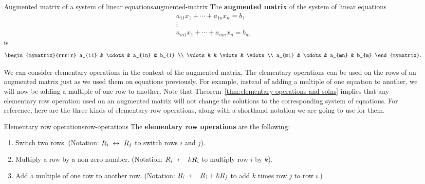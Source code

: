 \begin{definition}{Augmented matrix of a system of linear equations}{augmented-matrix}
  The \textbf{augmented matrix}
  of the system of linear equations
  \begin{equation*}
    \begin{array}{c}
      a_{11}x_{1}+\cdots +a_{1n}x_{n}=b_{1} \\
      \vdots \\
      a_{m1}x_{1}+\cdots +a_{mn}x_{n}=b_{m}
    \end{array}
  \end{equation*}
  is
  \begin{equation*}
    \begin{mymatrix}{rrr|r}
      a_{11} & \cdots & a_{1n} &  b_{1} \\
      \vdots &  & \vdots &  \vdots \\
      a_{m1} & \cdots & a_{mn} &  b_{m}
    \end{mymatrix}.
  \end{equation*}
\end{definition}

We can consider elementary operations in the context of the augmented
matrix. The elementary operations can be used on the rows of an
augmented matrix just as we used them on equations previously. For
example, instead of adding a multiple of one equation to another, we
will now be adding a multiple of one row to another. Note that
Theorem~\ref{thm:elementary-operations-and-solns} implies that any
elementary row operation used on an augmented matrix will not change
the solutions to the corresponding system of equations. For reference,
here are the three kinds of elementary row operations, along with a
shorthand notation we are going to use for them.

\begin{definition}{Elementary row operations}{row-operations}
  The \textbf{elementary row operations}%
   are the
  following:
  \begin{enumerate}
  \item Switch two rows. (Notation: $R_i~\leftrightarrow~ R_j$ to switch
    rows $i$ and $j$).
  \item Multiply a row by a non-zero number.  (Notation: $R_i~\leftarrow~
    kR_i$ to multiply row $i$ by $k$).    
  \item Add a multiple of one row to another row. (Notation:
    $R_i~\leftarrow~ R_i+kR_j$ to add $k$ times row $j$ to row $i$.)
  \end{enumerate}
\end{definition}

